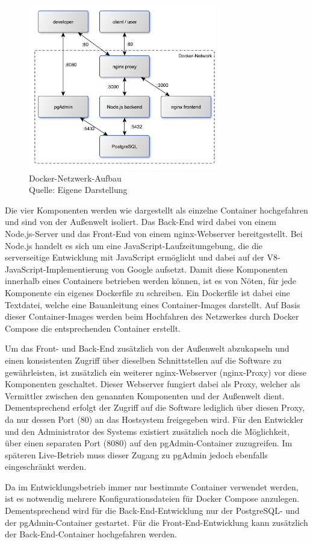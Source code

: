 \begin{figure}[H]
	\centering
	\includegraphics[width=0.75\textwidth]{img/implementierung/network.pdf}
	\captionsetup{justification=centering, format=plain}
	\caption[Docker-Netzwerk-Aufbau]{Docker-Netzwerk-Aufbau \\Quelle: Eigene Darstellung}
	\label{fig:implementierung:docker}
\end{figure}

Die vier Komponenten werden wie dargestellt als einzelne Container hochgefahren und sind von der Außenwelt isoliert.
Das Back-End wird dabei von einem Node.js-Server und das Front-End von einem nginx-Webserver bereitgestellt.
Bei Node.js handelt es sich um eine JavaScript-Laufzeitumgebung, die die serverseitige Entwicklung mit JavaScript ermöglicht und dabei auf der V8-JavaScript-Implementierung von Google aufsetzt.\autocite[Vgl.][]{nl-openjsfoundation2020nodejs}
Damit diese Komponenten innerhalb eines Containers betrieben werden können, ist es von Nöten, für jede Komponente ein eigenes Dockerfile zu schreiben.
Ein Dockerfile ist dabei eine Textdatei, welche eine Bauanleitung eines Container-Images darstellt.
Auf Basis dieser Container-Images werden beim Hochfahren des Netzwerkes durch Docker Compose die entsprechenden Container erstellt.

Um das Front- und Back-End zusätzlich von der Außenwelt abzukapseln und einen konsistenten Zugriff über dieselben Schnittstellen auf die Software zu gewährleisten, ist zusätzlich ein weiterer nginx-Webserver (nginx-Proxy) vor diese Komponenten geschaltet.
Dieser Webserver fungiert dabei als Proxy, welcher als Vermittler zwischen den genannten Komponenten und der Außenwelt dient.
Dementsprechend erfolgt der Zugriff auf die Software lediglich über diesen Proxy, da nur dessen Port (80) an das Hostsystem freigegeben wird.
Für den Entwickler und den Administrator des Systems existiert zusätzlich noch die Möglichkeit, über einen separaten Port (8080) auf den pgAdmin-Container zuzugreifen.
Im späteren Live-Betrieb muss dieser Zugang zu pgAdmin jedoch ebenfalls eingeschränkt werden.

Da im Entwicklungsbetrieb immer nur bestimmte Container verwendet werden, ist es notwendig mehrere Konfigurationsdateien für Docker Compose anzulegen.
Dementsprechend wird für die Back-End-Entwicklung nur der PostgreSQL- und der pgAdmin-Container gestartet.
Für die Front-End-Entwicklung kann zusätzlich der Back-End-Container hochgefahren werden.
